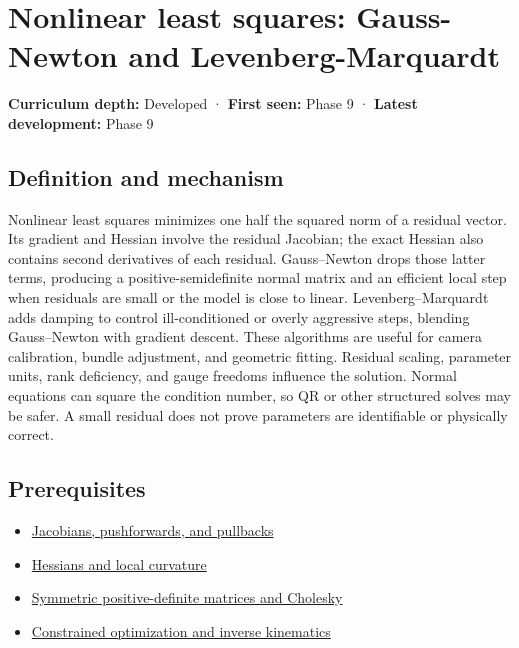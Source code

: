 \hypertarget{appendix-2c2df8345991}{}\label{referencestart:appendix-2c2df8345991}
\section{Nonlinear least squares: Gauss-Newton and Levenberg-Marquardt}\label{appendix-2c2df8345991-nonlinear-least-squares-gauss-newton-and-levenberg-marquardt}

\textbf{Curriculum depth:} Developed · \textbf{First seen:} Phase 9 · \textbf{Latest development:} Phase 9

\subsection{Definition and mechanism}\label{appendix-2c2df8345991-definition-and-mechanism}

Nonlinear least squares minimizes one half the squared norm of a residual vector. Its gradient and Hessian involve the residual Jacobian; the exact Hessian also contains second derivatives of each residual. Gauss--Newton drops those latter terms, producing a positive-semidefinite normal matrix and an efficient local step when residuals are small or the model is close to linear. Levenberg--Marquardt adds damping to control ill-conditioned or overly aggressive steps, blending Gauss--Newton with gradient descent. These algorithms are useful for camera calibration, bundle adjustment, and geometric fitting. Residual scaling, parameter units, rank deficiency, and gauge freedoms influence the solution. Normal equations can square the condition number, so QR or other structured solves may be safer. A small residual does not prove parameters are identifiable or physically correct.

\subsection{Prerequisites}\label{appendix-2c2df8345991-prerequisites}

\begin{itemize}
\tightlist
\item
  \hyperref[appendix-d8a7ddb675eb]{Jacobians, pushforwards, and pullbacks}
\item
  \hyperref[appendix-6ac071f8b50c]{Hessians and local curvature}
\item
  \hyperref[appendix-50d2ea3c9b26]{Symmetric positive-definite matrices and Cholesky}
\item
  \hyperref[appendix-29f4bea4c2bb]{Constrained optimization and inverse kinematics}
\end{itemize}

